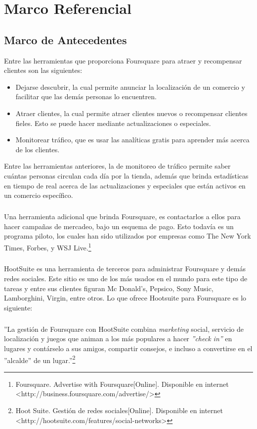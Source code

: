 \chapter{Marco Referencial}
\label{sec:marco}

\section{Marco de Antecedentes}
Entre las herramientas que proporciona Foursquare para atraer y recompensar clientes son las siguientes:
\begin{itemize}
\item Dejarse descubrir, la cual permite anunciar la localizaci\'on de un comercio y facilitar que las dem\'as personas lo encuentren.
\item Atraer clientes, la cual permite atraer clientes nuevos o recompensar clientes fieles. Esto se puede hacer mediante actualizaciones o especiales.
\item Monitorear tr\'afico, que es usar las anal\'iticas gratis para aprender m\'as acerca de los clientes.
\end{itemize}
Entre las herramientas anteriores, la de monitoreo de tr\'afico permite saber cu\'antas personas circulan cada d\'ia por la tienda, adem\'as que brinda estad\'isticas en tiempo de real acerca de  las actualizaciones y especiales que est\'an activos en un comercio espec\'ifico.
\paragraph{}
Una herramienta adicional que brinda Foursquare, es contactarlos a ellos para hacer campa\~nas de mercadeo, bajo un esquema de pago. Esto todav\'ia es un programa piloto, los cuales han sido utilizados por empresas como The New York Times, Forbes, y WSJ Live.\footnote{Foursquare. Advertise with Foursquare[Online]. Disponible en internet \textless http://business.foursquare.com/advertise/\textgreater}
\paragraph{}
HootSuite es una herramienta de terceros para administrar Foursquare y dem\'as redes sociales. Este sitio es uno de los m\'as usados en el mundo para este tipo de tareas y entre sus clientes figuran Mc Donald’s, Pepsico, Sony Music, Lamborghini, Virgin, entre otros. Lo que ofrece Hootsuite para Foursquare es lo siguiente:
\paragraph{}
''La gesti\'on de Foursquare con HootSuite combina \textit{marketing} social, servicio de localizaci\'on y juegos que animan a los m\'as populares a hacer \textit{''check in''} en lugares y cont\'arselo a sus amigos, compartir consejos, e incluso a convertirse en el ''alcalde'' de un lugar.''\footnote{Hoot Suite. Gesti\'on de redes sociales[Online]. Disponible en internet \textless http://hootsuite.com/features/social-networks\textgreater}

